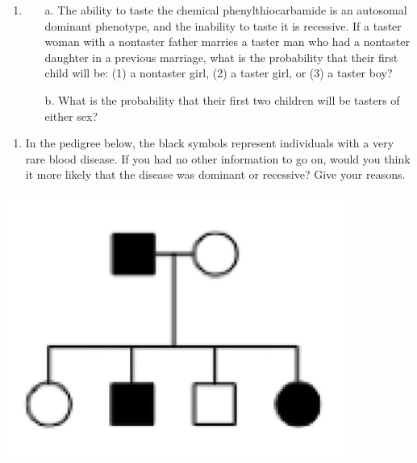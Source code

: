 \documentclass[11pt,]{article}
\providecommand{\tightlist}{%
  \setlength{\itemsep}{0pt}\setlength{\parskip}{0pt}}
\begin{document}
\begin{blackbox}

\begin{enumerate}
\def\labelenumi{\arabic{enumi}.}
\setcounter{enumi}{41}
\item
  \begin{enumerate} 
   \item[a.]{ The ability to taste the chemical phenylthiocarbamide is an autosomal dominant phenotype, and the inability to taste it is recessive. If a taster woman with a nontaster father marries a taster man who had a nontaster daughter in a previous marriage, what is the probability that their first child will be: (1) a nontaster girl, (2) a taster girl, or (3) a taster boy? } 
   \item[b.]{ What is the probability that their first two children will be tasters of either sex? } 
   \end{enumerate}
\end{enumerate}

\hfill\break

\vspace{17cm}

\end{blackbox}

\begin{blackbox}

\begin{enumerate}
\def\labelenumi{\arabic{enumi}.}
\setcounter{enumi}{42}
\tightlist
\item
  In the pedigree below, the black symbols represent individuals with a
  very rare blood disease. If you had no other information to go on,
  would you think it more likely that the disease was dominant or
  recessive? Give your reasons.
\end{enumerate}

\hfill\break

\begin{center}\includegraphics[width=0.35\linewidth,]{input/43pedigree} \end{center}

\vspace{15cm}

\end{blackbox}
\end{document}
